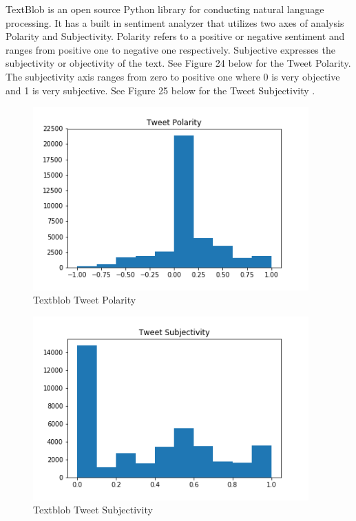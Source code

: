 \documentclass[12pt,oneside]{chicagocapstone}
\begin{document}
TextBlob is an open source Python library for conducting natural
language processing. It has a built in sentiment analyzer that utilizes
two axes of analysis Polarity and Subjectivity. Polarity refers to a
positive or negative sentiment and ranges from positive one to negative
one respectively. Subjective expresses the subjectivity or objectivity
of the text. See Figure 24 below for the Tweet Polarity. The
subjectivity axis ranges from zero to positive one where 0 is very
objective and 1 is very subjective. See Figure 25 below for the Tweet
Subjectivity .
\begin{figure}

{\centering \includegraphics[width=400px]{figure/Tweet_Polarity} 

}

\caption{Textblob Tweet Polarity}\label{fig:tweet-polarity}
\end{figure}
\begin{figure}

{\centering \includegraphics[width=400px]{figure/Tweet_Subjectivity} 

}

\caption{Textblob Tweet Subjectivity}\label{fig:tweet-subjectivity}
\end{figure}
\end{document}
